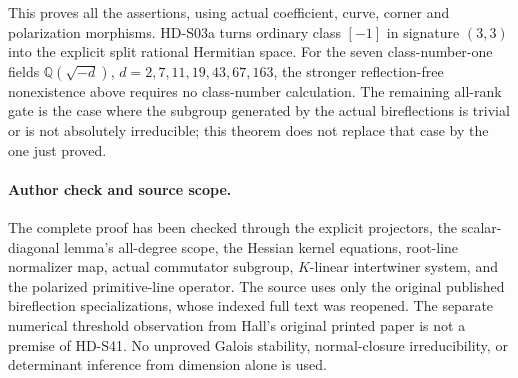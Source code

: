 This proves all the assertions, using actual coefficient,
curve, corner and polarization morphisms. HD-S03a turns
ordinary class \([-1]\) in signature \((3,3)\) into the
explicit split rational Hermitian space. For the seven
class-number-one fields \(\mathbb Q(\sqrt{-d})\),
\(d=2,7,11,19,43,67,163\), the stronger reflection-free
nonexistence above requires no class-number calculation.
The remaining all-rank gate is the case where the subgroup
generated by the actual bireflections is trivial or is not
absolutely irreducible; this theorem does not replace that
case by the one just proved.

\paragraph{Author check and source scope.}
The complete proof has been checked through the explicit
projectors, the scalar-diagonal lemma's all-degree scope,
the Hessian kernel equations, root-line normalizer map,
actual commutator subgroup, \(K\)-linear intertwiner system,
and the polarized primitive-line operator. The source uses
only the original published bireflection specializations,
whose indexed full text was reopened. The separate numerical
threshold observation from Hall's original printed paper is
not a premise of HD-S41. No unproved Galois stability,
normal-closure irreducibility, or determinant inference from
dimension alone is used.
